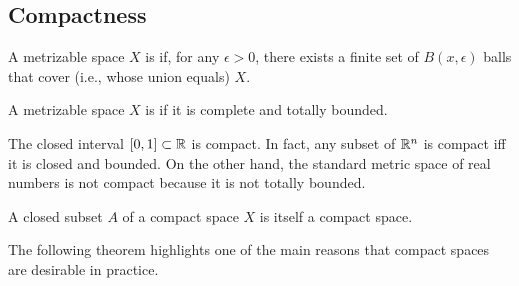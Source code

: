 \subsection{Compactness}

\begin{definition}
A metrizable space $X$ is  if, for any $\epsilon > 0$, there exists a finite set of $B(x,\epsilon)$ balls that cover (i.e., whose union equals) $X$.
\end{definition}

\begin{definition}
A metrizable space $X$ is  if it is complete and totally bounded.
\end{definition}

The closed interval $[0,1]\subset \mathbb{R}$ is compact.
In fact, any subset of $\mathbb{R}^n$ is compact iff it is closed and bounded.
On the other hand, the standard metric space of real numbers is not compact because it is not totally bounded.

\begin{theorem}
\label{thm:CompactClosedSubsetCompact}
A closed subset $A$ of a compact space $X$ is itself a compact space.
\end{theorem}

The following theorem highlights one of the main reasons that compact spaces are desirable in practice.

